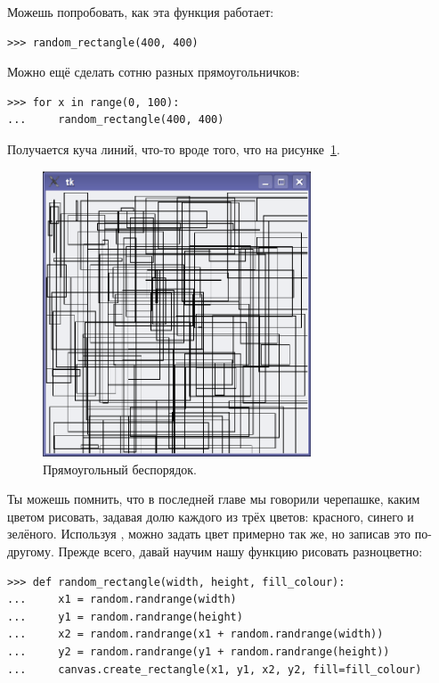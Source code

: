 Можешь попробовать, как эта функция работает:

\begin{listing}
\begin{verbatim}
>>> random_rectangle(400, 400)
\end{verbatim}
\end{listing}

Можно ещё сделать сотню разных прямоугольничков:

\begin{listing}
\begin{verbatim}
>>> for x in range(0, 100):
...     random_rectangle(400, 400)
\end{verbatim}
\end{listing}

Получается куча линий, что-то вроде того, что на рисунке \ref{fig34}.

\begin{figure}
\begin{center}
\includegraphics[width=80mm]{../en/figure34.eps}
\end{center}
\caption{Прямоугольный беспорядок.}\label{fig34}
\end{figure}

Ты можешь помнить, что в последней главе мы говорили черепашке, каким цветом рисовать, задавая долю каждого из трёх цветов: красного, синего и зелёного. Используя , можно задать цвет примерно так же, но записав это по-другому. Прежде всего, давай научим нашу функцию рисовать разноцветно:


\begin{listing}
\begin{verbatim}
>>> def random_rectangle(width, height, fill_colour):
...     x1 = random.randrange(width)
...     y1 = random.randrange(height)
...     x2 = random.randrange(x1 + random.randrange(width))
...     y2 = random.randrange(y1 + random.randrange(height))
...     canvas.create_rectangle(x1, y1, x2, y2, fill=fill_colour)
\end{verbatim}
\end{listing}

